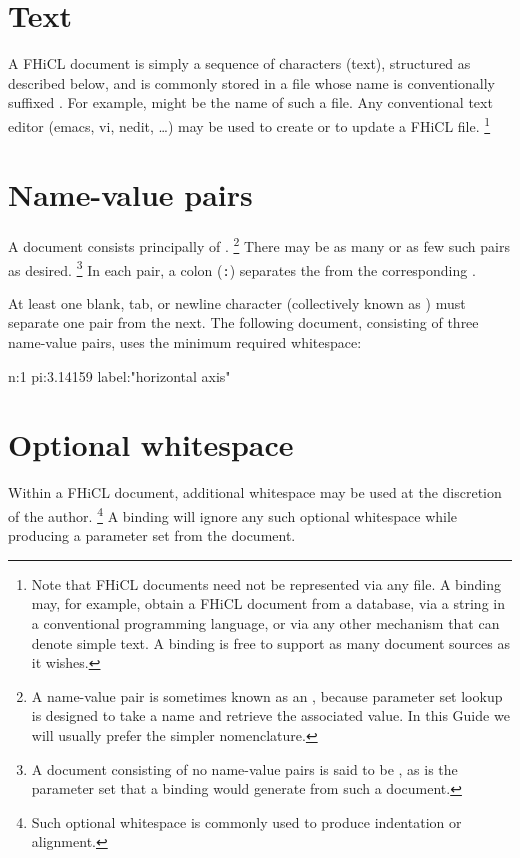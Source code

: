 \documentclass{memarticle}
\newcommand{\fhicl}%
 {FHiCL\xspace}
\begin{document}
\section{Text}

A \fhicl document is simply a sequence of characters
(\ie text),
structured as described below,
and is commonly stored in a file
whose name is conventionally suffixed .
For example,
 might be the name of such a file.
Any conventional text editor
(\eg emacs, vi, nedit, \ldots)
may be used to create or to update a \fhicl file.%
\footnote{%
  Note that \fhicl documents
  need not be represented via any file.
  A binding may, for example,
  obtain a \fhicl document
  from a database,
  via a string in a conventional programming language,
  or
  via any other mechanism that can denote simple text.
  A binding is free
  to support as many document sources
  as it wishes.%
}

\section{Name-value pairs}

A document consists principally
of .%
\footnote{%
  A name-value pair is sometimes known
  as an ,
  because parameter set lookup
  is designed to take a name
  and retrieve the associated value.
  In this Guide
  we will usually prefer the simpler  nomenclature.%
}
There may be as many or as few such pairs
as desired.%
\footnote{%
  A document consisting of no name-value pairs
  is said to be ,
  as is the parameter set
  that a binding would generate
  from such a document.%
}
In each pair,
a colon (\verb|:|) separates the 
from the corresponding .

At least one blank, tab, or newline character
(collectively known as )
must separate one pair from the next.
The following document,
consisting of three name-value pairs,
uses the minimum required whitespace:
\Needspace{.17in}
\begin{fcllisting}[texcl,escapechar=`]
n:1 pi:3.14159 label:"horizontal axis"
\end{fcllisting}

\section{Optional whitespace}

Within a \fhicl document,
additional whitespace
may be used
at the discretion of the author.%
\footnote{%
  Such optional whitespace
  is commonly used
  to produce indentation or alignment.%
}
A binding will ignore
any such optional whitespace
while producing a parameter set
from the document.
\end{document}
